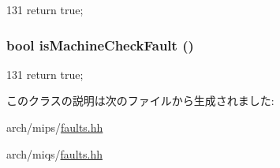 \begin{DoxyCode}
131 { return true; }
\end{DoxyCode}
\hypertarget{classMipsISA_1_1MachineCheckFault_aeb744a50ac5af95578632b1024bded5e}{
\subsubsection[{isMachineCheckFault}]{\setlength{\rightskip}{0pt plus 5cm}bool isMachineCheckFault ()}}
\label{classMipsISA_1_1MachineCheckFault_aeb744a50ac5af95578632b1024bded5e}



\begin{DoxyCode}
131 { return true; }
\end{DoxyCode}


このクラスの説明は次のファイルから生成されました:\begin{DoxyCompactItemize}
\item 
arch/mips/\hyperlink{arch_2mips_2faults_8hh}{faults.hh}\item 
arch/miqs/\hyperlink{arch_2miqs_2faults_8hh}{faults.hh}\end{DoxyCompactItemize}
